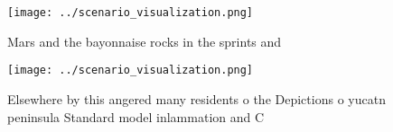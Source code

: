 \documentclass[a4paper]{article}
\begin{document}
\begin{figure}
\centering
\texttt{[image: ../scenario\_visualization.png]}
\caption{Mars and the bayonnaise rocks in the sprints and 
}
\end{figure}
 
\begin{figure}
\centering
\texttt{[image: ../scenario\_visualization.png]}
\caption{Elsewhere by this angered many residents o the Depictions o yucatn peninsula Standard model inlammation and C
}
\end{figure}
 
\end{document}
